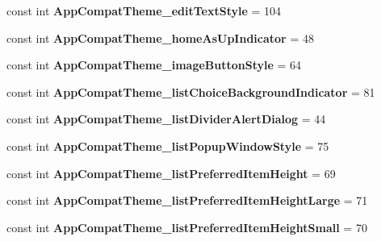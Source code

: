 \begin{DoxyCompactItemize}
\item 
\mbox{\label{classXaria_1_1Resource_1_1Styleable_a7cdab65f5c759146681cfa08bcf323f8}} 
const int {\bfseries App\+Compat\+Theme\+\_\+edit\+Text\+Style} = 104
\item 
\mbox{\label{classXaria_1_1Resource_1_1Styleable_a5e84ef46cbdd27bc4baf58bc0f9d9f02}} 
const int {\bfseries App\+Compat\+Theme\+\_\+home\+As\+Up\+Indicator} = 48
\item 
\mbox{\label{classXaria_1_1Resource_1_1Styleable_ab16e8b2c813a980a70f57edb9bd5b37e}} 
const int {\bfseries App\+Compat\+Theme\+\_\+image\+Button\+Style} = 64
\item 
\mbox{\label{classXaria_1_1Resource_1_1Styleable_ad3fcb9b3008b0523e4b5c83bda933caf}} 
const int {\bfseries App\+Compat\+Theme\+\_\+list\+Choice\+Background\+Indicator} = 81
\item 
\mbox{\label{classXaria_1_1Resource_1_1Styleable_adf1003ba7e857baf0d698f3034c5e912}} 
const int {\bfseries App\+Compat\+Theme\+\_\+list\+Divider\+Alert\+Dialog} = 44
\item 
\mbox{\label{classXaria_1_1Resource_1_1Styleable_a85dbd6d3b18b05185d2efc710cd750d8}} 
const int {\bfseries App\+Compat\+Theme\+\_\+list\+Popup\+Window\+Style} = 75
\item 
\mbox{\label{classXaria_1_1Resource_1_1Styleable_ad937acc1e83409f67f24e85bf1b670f7}} 
const int {\bfseries App\+Compat\+Theme\+\_\+list\+Preferred\+Item\+Height} = 69
\item 
\mbox{\label{classXaria_1_1Resource_1_1Styleable_aa877f0bc75d40e988da9cb905384a702}} 
const int {\bfseries App\+Compat\+Theme\+\_\+list\+Preferred\+Item\+Height\+Large} = 71
\item 
\mbox{\label{classXaria_1_1Resource_1_1Styleable_a61f2ac4bafe9744d25844a027433ffb7}} 
const int {\bfseries App\+Compat\+Theme\+\_\+list\+Preferred\+Item\+Height\+Small} = 70

\end{DoxyCompactItemize}
